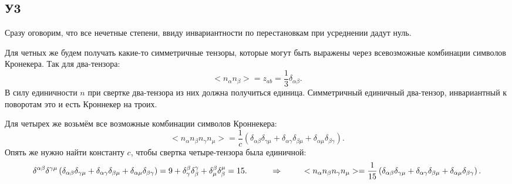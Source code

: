 \subsection*{У3}
Сразу оговорим, что все нечетные степени, ввиду инвариантности по перестановкам при усреднении дадут нуль.

Для четных же будем получать какие-то симметричные тензоры, которые могут быть выражены через всевозможные комбинации символов Кронекера. Так для два-тензора:
\begin{equation*}
	< n_\alpha n_\beta> = z_{a b} = \frac{1}{3} \delta_{\alpha \beta}.
\end{equation*}
В силу единичности $n$ при свертке два-тензора из них должна получиться единица. Симметричный единичный два-тензор, инвариантный к поворотам это и есть Кроннекер на троих.

Для четырех же возьмём все возможные комбинации символов Кроннекера:
\begin{equation*}
	<n_\alpha n_\beta n_\gamma n_\mu> = \frac{1}{c} 
	\left(
	\delta_{\alpha \beta} \delta_{\gamma \mu} + \delta_{\alpha \gamma} \delta_{\beta \mu} + \delta_{\alpha \mu} \delta_{\beta \gamma}
	\right).
\end{equation*}
Опять же нужно найти константу $c$, чтобы свертка четыре-тензора была единичной:
\begin{equation*}
	\delta^{\alpha \beta} \delta^{\gamma \mu}\left(
	\delta_{\alpha \beta} \delta_{\gamma \mu} + \delta_{\alpha \gamma} \delta_{\beta \mu} + \delta_{\alpha \mu} \delta_{\beta \gamma}
	\right) = 9 + \delta_{\gamma}^{\beta} \delta_{\beta}^{\gamma}  + \delta_{\mu}^{\beta} \delta_{\beta}^{\mu} = 15.
	\hspace{1 cm}
	 \Rightarrow
	 \hspace{1 cm}
	 <n_\alpha n_\beta n_\gamma n_\mu> = \frac{1}{15} 
	\left(
	\delta_{\alpha \beta} \delta_{\gamma \mu} + \delta_{\alpha \gamma} \delta_{\beta \mu} + \delta_{\alpha \mu} \delta_{\beta \gamma}
	\right).
\end{equation*}